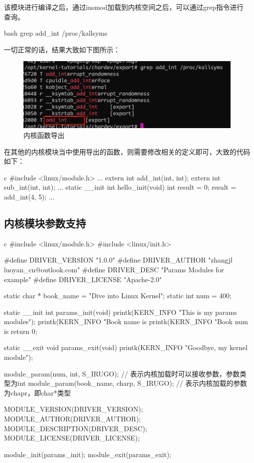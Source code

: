 该模块进行编译之后，通过insmod加载到内核空间之后，可以通过grep指令进行查询。
\begin{code-block}{bash}
grep add_int /proc/kallsyms
\end{code-block}
一切正常的话，结果大致如下图所示：
\begin{figure}[H]
  \centering
  \includegraphics[width=\linewidth]{export.png}
  \caption{内核函数导出}
  \label{fig:export}
\end{figure}

在其他的内核模块当中使用导出的函数，则需要修改相关的定义即可，大致的代码如下：
\begin{code-block}{c}
#include <linux/module.h>
...
extern int add_int(int, int);
extern int sub_int(int, int);
...
static __init int hello_init(void)
{
    int result = 0;
    result = add_int(4, 5);
...
}
\end{code-block}

\subsection{内核模块参数支持}
\begin{code-block}{c}
#include <linux/module.h>
#include <linux/init.h>

#define DRIVER_VERSION  "1.0.0"
#define DRIVER_AUTHOR   "zhangjl luoyan_cn@outlook.com"
#define DRIVER_DESC     "Params Modules for example"
#define DRIVER_LICENSE  "Apache-2.0"

static char * book_name = "Dive into Linux Kernel";
static int num = 400;

static __init int params_init(void)
{
        printk(KERN_INFO "This is my params modules\n");
        printk(KERN_INFO "Book name is %
        printk(KERN_INFO "Book num is %
        return 0;
}

static __exit void params_exit(void)
{
        printk(KERN_INFO "Goodbye, my kernel module\n");
}

module_param(num, int, S_IRUGO); // 表示内核加载时可以接收参数，参数类型为int
module_param(book_name, charp, S_IRUGO); // 表示内核加载的参数为chapr，即char*类型

MODULE_VERSION(DRIVER_VERSION);
MODULE_AUTHOR(DRIVER_AUTHOR);
MODULE_DESCRIPTION(DRIVER_DESC);
MODULE_LICENSE(DRIVER_LICENSE);

module_init(params_init);
module_exit(params_exit);
\end{code-block}

